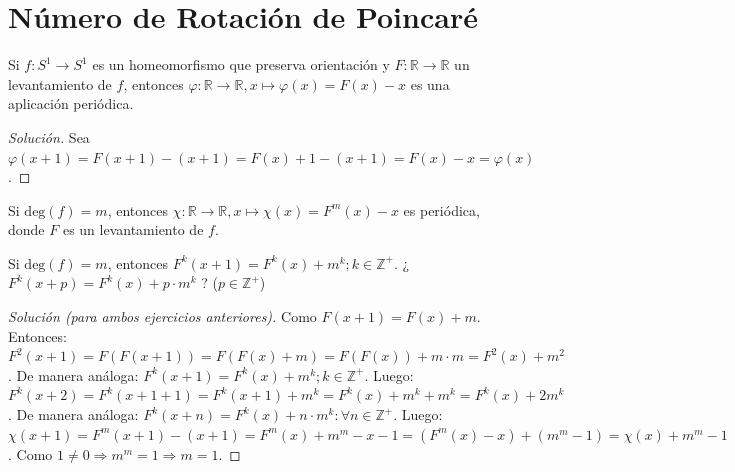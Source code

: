 \section{Número de Rotación de Poincaré}

\begin{ejercicio}
	Si $f: S^1 \to S^1$ es un homeomorfismo que preserva orientación y $F: \mathbb{R} \to \mathbb{R}$ un levantamiento de $f$, entonces $\varphi: \mathbb{R} \to \mathbb{R}, x \mapsto \varphi(x) = F(x)-x$ es una aplicación periódica.
\end{ejercicio}
\begin{proof}[Solución]
	Sea $\varphi(x+1) = F(x+1) - (x+1) = F(x)+1 - (x+1) = F(x) - x = \varphi(x)$.
\end{proof}

\begin{ejercicio}
	Si $\text{deg}(f)=m$, entonces $\chi: \mathbb{R} \to \mathbb{R}, x \mapsto \chi(x) = F^m(x)-x$ es periódica, donde $F$ es un levantamiento de $f$.
\end{ejercicio}

\begin{ejercicio}
	Si $\text{deg}(f)=m$, entonces $F^k(x+1) = F^k(x) + m^k ; k \in \mathbb{Z}^+$. ¿ $F^k(x+p) = F^k(x) + p \cdot m^k$ ? ($p \in \mathbb{Z}^+$)
\end{ejercicio}
\begin{proof}[Solución (para ambos ejercicios anteriores)]
	Como $F(x+1) = F(x)+m$.
	Entonces: $F^2(x+1) = F(F(x+1)) = F(F(x)+m) = F(F(x)) + m \cdot m = F^2(x) + m^2$. De manera análoga: $F^k(x+1) = F^k(x) + m^k ; k \in \mathbb{Z}^+$.
	Luego: $F^k(x+2) = F^k(x+1+1) = F^k(x+1)+m^k = F^k(x)+m^k+m^k = F^k(x)+2m^k$. De manera análoga: $F^k(x+n) = F^k(x) + n \cdot m^k : \forall n \in \mathbb{Z}^+$.
	Luego: $\chi(x+1) = F^m(x+1) - (x+1) = F^m(x) + m^m - x - 1 = (F^m(x) - x) + (m^m - 1) = \chi(x) + m^m - 1$. Como $1 \neq 0 \Rightarrow m^m = 1 \Rightarrow m = 1$.
\end{proof}

